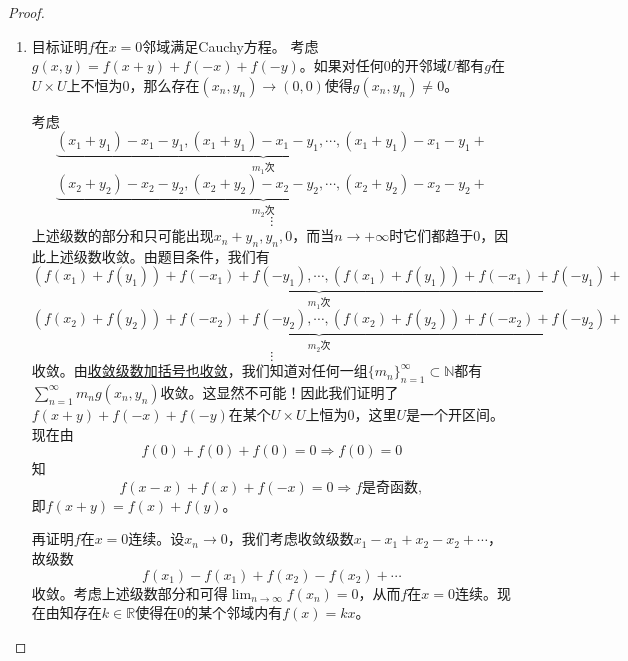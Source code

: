\documentclass[../../main.tex]{subfiles}
\begin{document}
\begin{proof}
\begin{enumerate}
\item 目标证明$f$在$x=0$邻域满足Cauchy方程。
考虑$g(x,y)=f(x+y)+f(-x)+f(-y)$。如果对任何$0$的开邻域$U$都有$g$在$U\times U$上不恒为$0$，那么存在$(x_n,y_n)\to(0,0)$使得$g(x_n,y_n)\neq0$。

考虑
\[
\underbrace{(x_1+y_1)-x_1-y_1,(x_1+y_1)-x_1-y_1,\cdots,(x_1+y_1)-x_1-y_1}_{m_1次}+
\]
\[
\underbrace{(x_2+y_2)-x_2-y_2,(x_2+y_2)-x_2-y_2,\cdots,(x_2+y_2)-x_2-y_2}_{m_2次}+
\]
\[
\vdots
\]
上述级数的部分和只可能出现$x_n+y_n,y_n,0$，而当$n\to+\infty$时它们都趋于$0$，因此上述级数收敛。由题目条件，我们有
\[
\underbrace{(f(x_1)+f(y_1))+f(-x_1)+f(-y_1),\cdots,(f(x_1)+f(y_1))+f(-x_1)+f(-y_1)}_{m_1次}+
\]
\[
\underbrace{(f(x_2)+f(y_2))+f(-x_2)+f(-y_2),\cdots,(f(x_2)+f(y_2))+f(-x_2)+f(-y_2)}_{m_2次}+
\]
\[
\vdots
\]
收敛。由\hyperref[theorem:级数加括号的理解]{收敛级数加括号也收敛}，我们知道对任何一组$\{m_n\}_{n=1}^{\infty}\subset\mathbb{N}$都有$\sum_{n=1}^{\infty}m_ng(x_n,y_n)$收敛。这显然不可能！因此我们证明了$f(x+y)+f(-x)+f(-y)$在某个$U\times U$上恒为$0$，这里$U$是一个开区间。现在由
\[
f(0)+f(0)+f(0)=0\Rightarrow f(0)=0
\]
知
\[
f(x-x)+f(x)+f(-x)=0\Rightarrow f\text{是奇函数},
\]
即$f(x+y)=f(x)+f(y)$。

再证明$f$在$x=0$连续。设$x_n\to0$，我们考虑收敛级数$x_1-x_1+x_2-x_2+\cdots$，故级数
\[
f(x_1)-f(x_1)+f(x_2)-f(x_2)+\cdots
\]
收敛。考虑上述级数部分和可得$\lim_{n\to\infty}f(x_n)=0$，从而$f$在$x=0$连续。现在由知存在$k\in\mathbb{R}$使得在$0$的某个邻域内有$f(x)=kx$。
\end{enumerate}

\end{proof}
\end{document}
